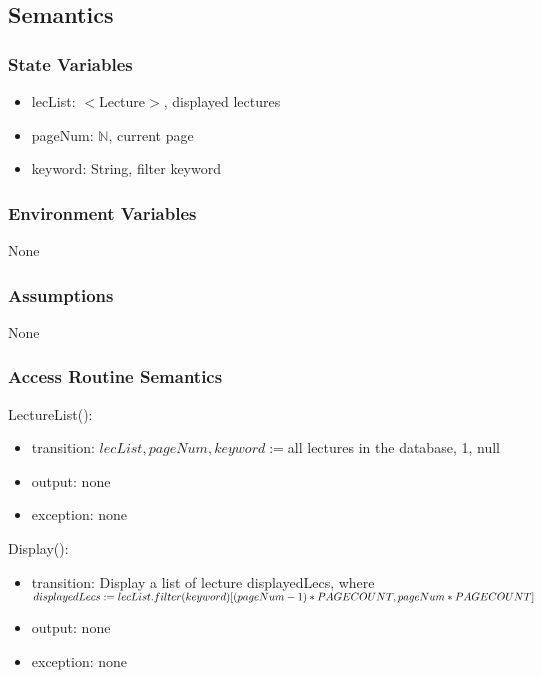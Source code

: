 \documentclass[12pt, titlepage]{article}
\begin{document}
\subsection{Semantics}

\subsubsection{State Variables}

\begin{itemize}
\item lecList: $<$Lecture$>$, displayed lectures
\item pageNum: $\mathbb{N}$, current page
\item keyword: String, filter keyword
\end{itemize}

\subsubsection{Environment Variables}

None

\subsubsection{Assumptions}

None

\subsubsection{Access Routine Semantics}

\noindent LectureList():
\begin{itemize}
\item transition: $lecList, pageNum, keyword := $all lectures in the database, 1, null
\item output: none
\item exception: none
\end{itemize}

\noindent Display():
\begin{itemize}
\item transition: Display a list of lecture displayedLecs, where $displayedLecs := \\lecList.filter(keyword)[(pageNum-1) * PAGECOUNT, pageNum * PAGECOUNT]$
\item output: none
\item exception: none
\end{itemize}
\end{document}
